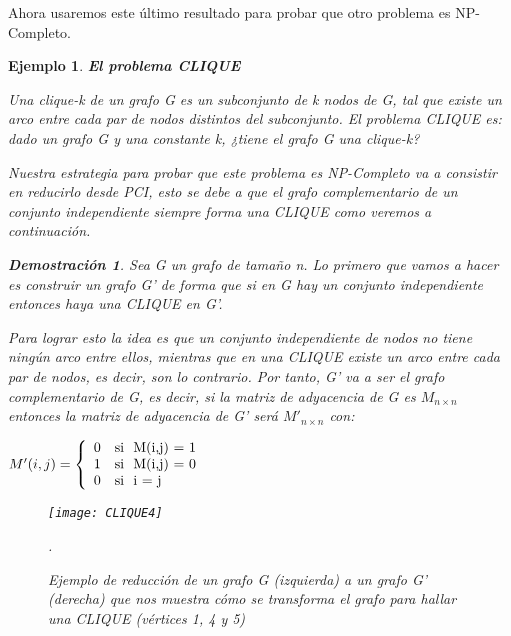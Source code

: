\documentclass[a4paper,12pt,titlepage]{article}
\newtheorem{eje}{Ejemplo}[section]
\newtheorem*{dem}{\textbf{Demostraci\'on}}
\begin{document}
Ahora usaremos este \'ultimo resultado para probar que otro problema es NP-Completo.

\begin{eje}
\textbf{El problema CLIQUE}
\vspace{\baselineskip}

Una clique-k de un grafo G es un subconjunto de k nodos de G, tal que existe un arco entre cada par de nodos distintos del subconjunto. El problema CLIQUE es: dado un grafo G y una constante k, ¿tiene el grafo G una clique-k?

Nuestra estrategia para probar que este problema es NP-Completo va a consistir en reducirlo desde PCI, esto se debe a que el grafo complementario de un conjunto independiente siempre forma una CLIQUE como veremos a continuaci\'on.

\begin{dem}

Sea G un grafo de tamaño n. Lo primero que vamos a hacer es construir un grafo G' de forma que si en G hay un conjunto independiente entonces haya una CLIQUE en G'.

Para lograr esto la idea es que un conjunto independiente de nodos no tiene ning\'un arco entre ellos, mientras que en una CLIQUE existe un arco entre cada par de nodos, es decir, son lo contrario. Por tanto, G' va a ser el grafo complementario de G, es decir, si la matriz de adyacencia de G es $M_{n\times n}$ entonces la matriz de adyacencia de G' ser\'a $M'_{n\times n}$ con:

\vspace{\baselineskip}

\begin{center}

$ M'(i,j) = \left \lbrace
\begin{array}{l l}
0 & \mbox{si }\mbox{ M(i,j) = 1} \\
1 & \mbox{si }\mbox{ M(i,j) = 0} \\
0 & \mbox{si }\mbox{ i = j}
\end{array}
\right. $

\end{center}

\begin{figure}[h]
\centering
\texttt{[image: CLIQUE4]}
\caption{Ejemplo de reducción de un grafo G (izquierda) a un grafo G' (derecha) que nos muestra c\'omo se transforma el grafo para hallar una CLIQUE (vértices 1, 4 y 5)}.
\label{CLIQUE}
\end{figure}


\end{dem}
\end{eje}
\end{document}
